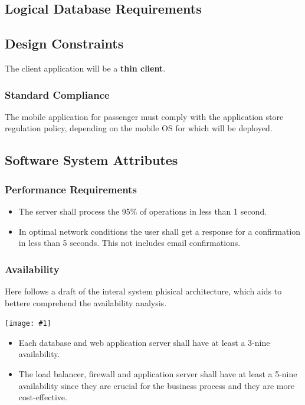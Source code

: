 \documentclass[11pt, a4paper,titlepage]{article}
\newcommand{\image}[1]{
	\begin{center}
		\noindent \texttt{[image: \#1]}
	\end{center}
	}
\begin{document}
\subsection{Logical Database Requirements}
\subsection{Design Constraints}
 The client application will be a \textbf{thin client}.
\subsubsection{Standard Compliance}
	The mobile application for passenger must comply with the application store regulation policy, depending on the mobile OS for which will be deployed.
\subsection{Software System Attributes}
\subsubsection{Performance Requirements} %
\begin{itemize}
	\item The server shall process the 95\% of operations in less than 1 second.
	\item In optimal network conditions the user shall get a response for a confirmation in less than 5 seconds. This not includes email confirmations. 
\end{itemize}
\subsubsection{Availability}
 Here follows a draft of the interal system phisical architecture, which aids to bettere comprehend the availability analysis.
  \image{schema_availability.png}
 \begin{itemize}
 \item Each database and web application server shall have at least a 3-nine availability.
 \item The load balancer, firewall and application server shall have at least a 5-nine availability since they are crucial for the business process and they are more cost-effective.
\end{itemize}
\end{document}
